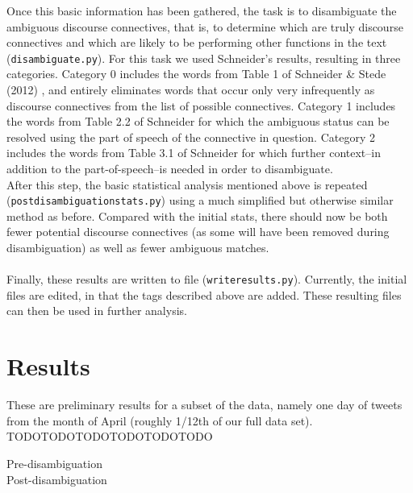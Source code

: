 \documentclass[11pt]{article}
\def\mono#1{\texttt{#1}}  %
\begin{document}
Once this basic information has been gathered, the task is to disambiguate the ambiguous discourse connectives, that is, to determine which are truly discourse connectives and which are likely to be performing other functions in the text (\mono{disambiguate.py}).  For this task we used Schneider's results, resulting in three categories.  Category 0 includes the words from Table 1 of Schneider \& Stede (2012) \cite{schneider2}, and entirely eliminates words that occur only very infrequently as discourse connectives from the list of possible connectives.  Category 1 includes the words from Table 2.2 of Schneider \cite{schneider1} for which the ambiguous status can be resolved using the part of speech of the connective in question.  Category 2 includes the words from Table 3.1 of Schneider \cite{schneider1} for which further context--in addition to the part-of-speech--is needed in order to disambiguate. \\

After this step, the basic statistical analysis mentioned above is repeated (\mono{post\textunderscore disambiguation\textunderscore stats.py}) using a much simplified but otherwise similar method as before.  Compared with the initial stats, there should now be both fewer potential discourse connectives (as some will have been removed during disambiguation) as well as fewer ambiguous matches.\\
\\
Finally, these results are written to file (\mono{write\textunderscore results.py}).  Currently, the initial files are edited, in that the tags described above are added.  These resulting files can then be used in further analysis.

\section{Results}

These are preliminary results for a subset of the data, namely one day of tweets from the month of April (roughly 1/12th of our full data set). \\

TODOTODOTODOTODOTODOTODO

Pre-disambiguation\\

Post-disambiguation\\
\end{document}
